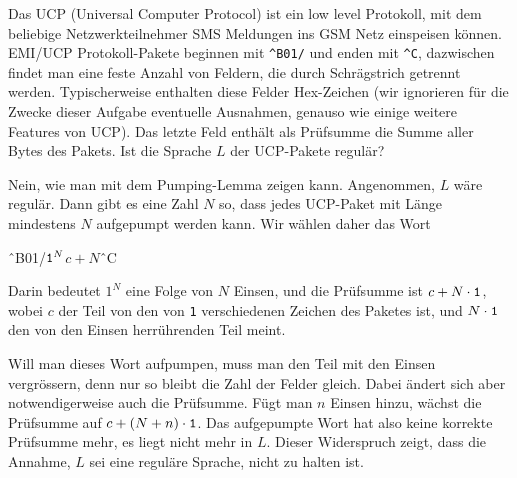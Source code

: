 Das UCP (Universal Computer Protocol) ist ein low level Protokoll,
mit dem beliebige Netzwerkteilnehmer SMS Meldungen ins GSM Netz einspeisen
können.
EMI/UCP Protokoll-Pakete beginnen mit \verb+^B01/+  und enden mit \verb+^C+,
dazwischen findet man eine feste Anzahl von Feldern, die durch
Schrägstrich getrennt werden. Typischerweise enthalten diese
Felder Hex-Zeichen (wir ignorieren für die Zwecke dieser Aufgabe
eventuelle Ausnahmen, genauso wie einige weitere Features von UCP).
Das letzte Feld enthält als Prüfsumme die
Summe aller Bytes des Pakets. Ist die Sprache $L$ der UCP-Pakete 
regulär?

\begin{loesung}
Nein, wie man mit dem Pumping-Lemma zeigen kann.
Angenommen, $L$ wäre regulär. Dann gibt es eine Zahl $N$ so,
dass jedes UCP-Paket mit Länge mindestens $N$ aufgepumpt werden
kann. Wir wählen daher das Wort 
\begin{center}
\^\ B01/$\text{\tt 1}^N$\text{/////}$c+N$\^\ C
\end{center}
Darin bedeutet $\text{1}^N$ eine Folge von $N$ Einsen, und die Prüfsumme
ist $c+N\cdot{\tt 1}$, wobei $c$ der Teil von den von {\tt 1}
verschiedenen Zeichen des Paketes ist, und $N\cdot\text{\tt 1}$
den von den Einsen herrührenden Teil meint.

Will man dieses Wort aufpumpen, muss man den Teil mit den Einsen
vergrössern, denn nur so bleibt die Zahl der Felder gleich. Dabei
ändert sich aber notwendigerweise auch die Prüfsumme. Fügt
man $n$ Einsen hinzu, wächst die Prüfsumme auf 
$c+(N+n)\cdot{\tt 1}$. Das aufgepumpte Wort hat also keine korrekte
Prüfsumme mehr, es liegt nicht mehr in $L$. Dieser Widerspruch
zeigt, dass die Annahme, $L$ sei eine reguläre Sprache, nicht zu
halten ist.
\end{loesung}
